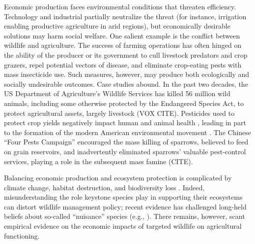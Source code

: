 

Economic production faces environmental conditions that threaten efficiency. Technology and industrial partially neutralize the threat (for instance, irrigation enabling productive agriculture in arid regions), but economically desirable solutions may harm social welfare. One salient example is the conflict between wildlife and agriculture. The success of farming operations has often hinged on the ability of the producer or its government to cull livestock predators and crop grazers, repel potential vectors of disease, and eliminate crop-eating pests with mass insecticide use. Such measures, however, may produce both ecologically and socially undesirable outcomes. Case studies abound. In the past two decades, the US Department of Agriculture's Wildlife Services has killed 56 million wild animals, including some otherwise protected by the Endangered Species Act, to protect agricultural assets, largely livestock (VOX CITE). Pesticides used to protect crop yields negatively impact human and animal health \citep{larsen_agricultural_2017}, leading in part to the formation of the modern American environmental movement \citep{woodwell_broken_1984}. The Chinese ``Four Pests Campaign'' encouraged the mass killing of sparrows, believed to feed on grain reservoirs, and inadvertently eliminated sparrows' valuable pest-control services, playing a role in the subsequent mass famine (CITE). 

Balancing economic production and ecosystem protection is complicated by climate change, habitat destruction, and biodiversity loss \citep{cardinale_biodiversity_2012}. Indeed, misunderstanding the role keystone species play in supporting their ecosystems can distort wildlife management policy; recent evidence has challenged long-held beliefs about so-called ``nuisance'' species (e.g., \cite{raynor_wolves_2021}). There remains, however, scant empirical evidence on the economic impacts of targeted wildlife on agricultural functioning.

